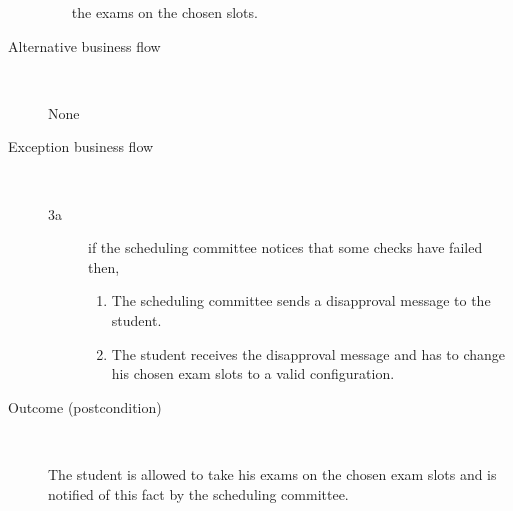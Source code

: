 \begin{description}
\begin{enumerate}
	  	the exams on the chosen slots.
	\end{enumerate}
	\item[Alternative business flow] \ 
		\par None
	\item[Exception business flow] \ 
	\begin{description}
		\item[3a] if the scheduling committee notices that some checks have failed
		then, 
		\begin{enumerate}
		  \item The scheduling committee sends a disapproval message to the student.
		  \item The student receives the disapproval message and has to change his
		  chosen exam slots to a valid configuration.
		\end{enumerate}
	\end{description}
	\item[Outcome (postcondition)] \ 
		\par The student is allowed to take his exams on the chosen exam slots and is
		notified of this fact by the scheduling committee.
\end{description}
